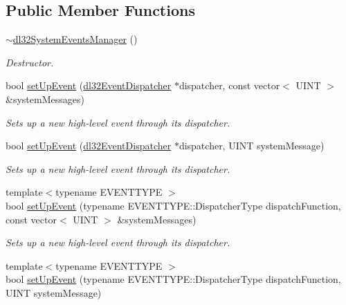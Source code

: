 \subsection*{Public Member Functions}
\begin{DoxyCompactItemize}
\item 
\hyperlink{classdl32_system_events_manager_a37f5bfdac50da387db781da7c8d64755}{$\sim$dl32\-System\-Events\-Manager} ()
\begin{DoxyCompactList}\small\item\em Destructor. \end{DoxyCompactList}\item 
bool \hyperlink{classdl32_system_events_manager_ac509a709e91dcb1a9239c949889dc369}{set\-Up\-Event} (\hyperlink{classdl32_event_dispatcher}{dl32\-Event\-Dispatcher} $\ast$dispatcher, const vector$<$ U\-I\-N\-T $>$ \&system\-Messages)
\begin{DoxyCompactList}\small\item\em Sets up a new high-\/level event through its dispatcher. \end{DoxyCompactList}\item 
bool \hyperlink{classdl32_system_events_manager_a0cf660cc13b46495f6cae5d387aa9303}{set\-Up\-Event} (\hyperlink{classdl32_event_dispatcher}{dl32\-Event\-Dispatcher} $\ast$dispatcher, U\-I\-N\-T system\-Message)
\begin{DoxyCompactList}\small\item\em Sets up a new high-\/level event through its dispatcher. \end{DoxyCompactList}\item 
{\footnotesize template$<$typename E\-V\-E\-N\-T\-T\-Y\-P\-E $>$ }\\bool \hyperlink{classdl32_system_events_manager_a45063dea4e7e802562475ef8282bcbd0}{set\-Up\-Event} (typename E\-V\-E\-N\-T\-T\-Y\-P\-E\-::\-Dispatcher\-Type dispatch\-Function, const vector$<$ U\-I\-N\-T $>$ \&system\-Messages)
\begin{DoxyCompactList}\small\item\em Sets up a new high-\/level event through its dispatcher. \end{DoxyCompactList}\item 
{\footnotesize template$<$typename E\-V\-E\-N\-T\-T\-Y\-P\-E $>$ }\\bool \hyperlink{classdl32_system_events_manager_a305ce2db049ad7f0d67ff87ab23d6746}{set\-Up\-Event} (typename E\-V\-E\-N\-T\-T\-Y\-P\-E\-::\-Dispatcher\-Type dispatch\-Function, U\-I\-N\-T system\-Message)

\end{DoxyCompactItemize}
